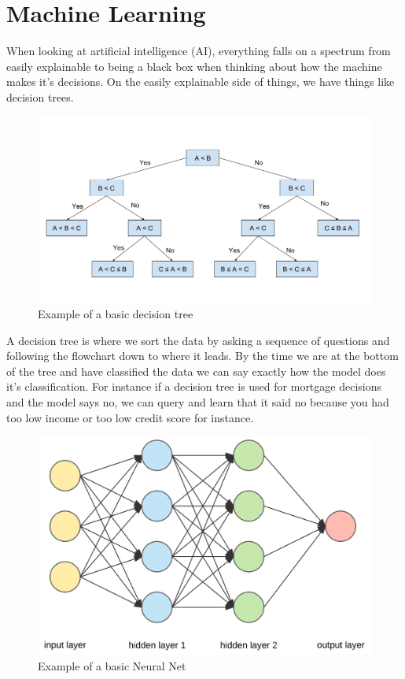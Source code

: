 \section{Machine Learning}

When looking at artificial intelligence (AI), everything falls on a spectrum from easily explainable to being a black box when thinking about how the machine makes it's decisions.
On the easily explainable side of things, we have things like decision trees.

\begin{figure}[H]
  \centering
  \includegraphics[width=120mm]{figures/decisionTree.png}
  \caption{Example of a basic decision tree}
  \label{decisionTree}
\end{figure}

A decision tree is where we sort the data by asking a sequence of questions and following the flowchart down to where it leads.
By the time we are at the bottom of the tree and have classified the data we can say exactly how the model does it's classification.
For instance if a decision tree is used for mortgage decisions and the model says no, we can query and learn that it said no because you had too low income or too low credit score for instance.

\begin{figure}[H]
  \centering
  \includegraphics[width=120mm]{figures/neuralNet1.png}
  \caption{Example of a basic Neural Net}
  \label{neuralNet1}
\end{figure}

